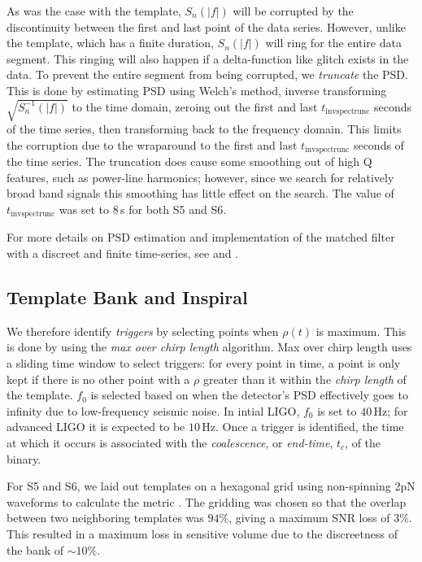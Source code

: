 As was the case with the template, $S_n(|f|)$ will be corrupted by the discontinuity between the first and last point of the data series. However, unlike the template, which has a finite duration, $S_n(|f|)$ will ring for the entire data segment. This ringing will also happen if a delta-function like glitch exists in the data. To prevent the entire segment from being corrupted, we \emph{truncate} the \ac{PSD}. This is done by estimating \ac{PSD} using Welch's method, inverse transforming $\sqrt{S_n^{-1}(|f|)}$ to the time domain, zeroing out the first and last $t_{\mathrm{invspectrunc}}$ seconds of the time series, then transforming back to the frequency domain. This limits the corruption due to the wraparound to the first and last $t_{\mathrm{invspectrunc}}$ seconds of the time series. The truncation does cause some smoothing out of high Q features, such as power-line harmonics; however, since we search for relatively broad band signals this smoothing has little effect on the search. The value of $t_{\mathrm{invspectrunc}}$ was set to $8\,$s for both \ac{S5} and \ac{S6}.

For more details on \ac{PSD} estimation and implementation of the matched filter with a discreet and finite time-series, see \cite{ref:Brown} and \cite{ref:FindChirp}.

\subsection{Template Bank and Inspiral}

We therefore identify \emph{triggers} by selecting points when $\rho(t)$ is maximum. This is done by using the \emph{max over chirp length} algorithm. Max over chirp length uses a sliding time window to select triggers: for every point in time, a point is only kept if there is no other point with a $\rho$ greater than it within the \emph{chirp length} of the template. $f_0$ is selected based on when the detector's \ac{PSD} effectively goes to infinity due to low-frequency seismic noise. In intial LIGO, $f_0$ is set to $40\,\mathrm{Hz}$; for advanced LIGO it is expected to be $10\,\mathrm{Hz}$. Once a trigger is identified, the time at which it occurs is associated with the \emph{coalescence}, or \emph{end-time}, $t_c$, of the binary.

For \ac{S5} and \ac{S6}, we laid out templates on a hexagonal grid using non-spinning 2\ac{pN} waveforms to calculate the metric \cite{?}. The gridding was chosen so that the overlap between two neighboring templates was $94\%$, giving a maximum \ac{SNR} loss of $3\%$. This resulted in a maximum loss in sensitive volume due to the discreetness of the bank of $\sim10\%$.

